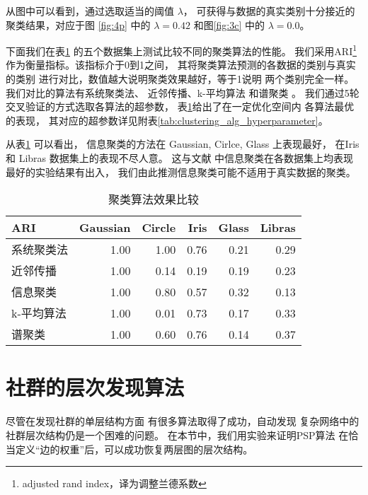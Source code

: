 从图中可以看到，通过选取适当的阈值 $\lambda$，
可获得与数据的真实类别十分接近的聚类结果，对应于图
\ref{fig:4p} 中的 $\lambda=0.42$
和图\ref{fig:3c} 中的 $\lambda=0.0$。

下面我们在表\ref{tab:clustering_dataset}
的五个数据集上测试比较不同的聚类算法的性能。
我们采用ARI\footnote{adjusted rand index，译为调整兰德系数}
作为衡量指标。该指标介于0到1之间，
其将聚类算法预测的各数据的类别与真实的类别
进行对比，数值越大说明聚类效果越好，等于1说明
两个类别完全一样。我们对比的算法有系统聚类法\cite{slink}、
近邻传播\cite{frey2007clustering}、k-平均算法
\cite{lloyd1982least}
和谱聚类 \cite{shi2000normalized}。
我们通过5轮交叉验证的方式选取各算法的超参数，
表\ref{tab:clustering_dataset}给出了在一定优化空间内
各算法最优的表现，
其对应的超参数详见附表\ref{tab:clustering_alg_hyperparameter}。

从表\ref{tab:clustering_dataset}
可以看出，
信息聚类的方法在 Gaussian, Cirlce, Glass 上表现最好，
在Iris 和 Libras 数据集上的表现不尽人意。
这与文献\citep{mac} 中信息聚类在各数据集上均表现最好的实验结果有出入，
我们由此推测信息聚类可能不适用于真实数据的聚类。

\begin{table}[!ht]
  \centering
\begin{tabular}{lrrrrr}
  \hline
   ARI  &   Gaussian &   Circle &   Iris &   Glass &   Libras \\
  \hline
   系统聚类法         &       1.00 &     1.00 &   0.76 &    0.21 &     0.29 \\
   近邻传播  &       1.00 &     0.14 &   0.19 &    0.19 &     0.23 \\
   信息聚类                  &       1.00 &     0.80 &   0.57 &    0.32 &     0.13 \\
   k-平均算法              &       1.00 &     0.01 &   0.73 &    0.17 &     0.33 \\
   谱聚类   &       1.00 &     0.60 &   0.76 &    0.14 &     0.37 \\
  \hline
\end{tabular}
\caption{聚类算法效果比较}\label{tab:clustering_dataset}
\end{table}

\section{社群的层次发现算法}
\label{subsec:cd}
尽管在发现社群的单层结构方面
有很多算法取得了成功，自动发现
复杂网络中的社群层次结构仍是一个困难的问题。
在本节中，我们用实验来证明PSP算法
在恰当定义“边的权重”后，可以成功恢复两层图的层次结构。

